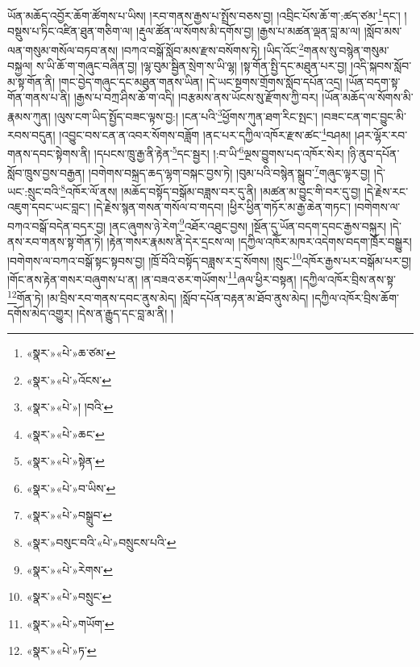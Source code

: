 ཡོན་མཆོད་འབྱོར་ཆོག་ཚོགས་པ་ཡིས། །རབ་གནས་རྒྱས་པ་སྤྲོས་བཅས་བྱ། །འབྲིང་པོས་ཆོ་ག་:ཚད་ཙམ་\footnote{«སྣར་»«པེ་»ཆ་ཙམ་}དང་། །བསྡུས་པ་ཏིང་འཛིན་ཐུན་གཅིག་ལ། །རྡུལ་ཚོན་ལ་སོགས་མི་དགོས་བྱ། །རྒྱས་པ་མཚན་ལྡན་བླ་མ་ལ། །སློབ་མས་ལན་གསུམ་གསོལ་བཏབ་ནས། །བཀའ་བསྒོ་སློབ་མས་རྫས་བསོགས་ཏེ། །ཡིད་འོང་\footnote{«སྣར་»«པེ་»འོངས་}གནས་སུ་བསྙེན་གསུམ་བསྐྱལ། ས་ཡི་ཆོ་ག་གཞུང་བཞིན་བྱ། །ལྷ་བུམ་སྦྱིན་སྲེག་ས་ཡི་ལྷ། །སྟ་གོན་སྤྱི་དང་མཐུན་པར་བྱ། །འདི་སྐབས་སློབ་མ་སྟ་གོན་ནི། །གང་བྱེད་གཞུང་དང་མཐུན་གནས་ཡིན། །དེ་ཡང་སྔགས་གྲོགས་སློབ་དཔོན་འདྲ། །ཡོན་བདག་སྟ་གོན་གནས་པ་ནི། །རྒྱས་པ་བཀྲ་ཤིས་ཆོ་ག་འདི། །བརྩམས་ནས་ཡོངས་སུ་རྫོགས་ཀྱི་བར། །ཡོན་མཆོད་ལ་སོགས་མི་རྣམས་ཀུན། །ལུས་ངག་ཡིད་སྤྱོད་བཟང་ལྟས་བྱ:། །ངན་པའི་\footnote{«སྣར་»«པེ་»། །བའི་}ཕྱོགས་ཀུན་ཐག་རིང་སྤང་། །བཟང་ངན་གང་བྱུང་མི་རབས་བདུན། །འབྱུང་བས་ངན་ན་འབར་སོགས་བཟློག །ནང་པར་དཀྱིལ་འཁོར་རྫས་ཚང་\footnote{«སྣར་»«པེ་»ཆང་}བཤམ། །ཤར་ལྷོར་རབ་གནས་དབང་སྟེགས་ནི། །དཔངས་ཁྲུ་རྒྱ་ནི་རྟེན་\footnote{«སྣར་»«པེ་»སྟེན་}དང་སྦྱར། །:བ་ཡི་\footnote{«སྣར་»«པེ་»བ་ཡིས་}ལྔས་བྱུགས་པད་འཁོར་སེར། །ཉི་ནུབ་དཔོན་སློབ་ཁྲུས་བྱས་བརྒྱན། །བགེགས་བསྐྲད་ཆད་ལྷག་བསྐང་བྱས་ཏེ། །བུམ་པའི་བསྙེན་སྒྲུབ་\footnote{«སྣར་»«པེ་»བསྒྲུབ་}གཞུང་ལྟར་བྱ། །དེ་ཡང་:སྲུང་བའི་\footnote{«སྣར་»བསུང་བའི་«པེ་»བསྲུངས་པའི་}འཁོར་ལོ་ནས། །མཆོད་བསྟོད་བསྒོམ་བཟླས་བར་དུ་ནི། །མཚན་མ་བྱུང་གི་བར་དུ་བྱ། །དེ་རྗེས་རང་འཇུག་དབང་ཡང་བླང་། །དེ་རྗེས་སྙན་གསན་གསོལ་བ་གདབ། །ཕྱིར་ཕྱིན་གཏོར་མ་རྒྱ་ཆེན་གཏང་། །བགེགས་ལ་བཀའ་བསྒོ་བདེན་བདར་བྱ། །ནང་ཞུགས་ཉེ་རེག་\footnote{«སྣར་»«པེ་»རེགས་}འཐོར་འཐུང་བྱས། །སྔོན་དུ་ཡོན་བདག་དབང་རྒྱས་བསྐུར། །དེ་ནས་རབ་གནས་སྟ་གོན་ཏེ། །རྟེན་གསར་རྣམས་ནི་དེར་དྲངས་ལ། །དཀྱིལ་འཁོར་མཁར་འདེགས་བདག་ཁྲོར་བསྒྱུར། །བགེགས་ལ་བཀའ་བསྒོ་སྟང་སྟབས་བྱ། །ཁྲོ་བོའི་བསྟོད་བཟླས་ར་དྲ་སོགས། །སྲུང་\footnote{«སྣར་»«པེ་»བསྲུང་}འཁོར་རྒྱས་པར་བསྒོམ་པར་བྱ། །གོང་ནས་རྟེན་གསར་བཞུགས་པ་ན། །ན་བཟའ་ཅར་གཡོགས་\footnote{«སྣར་»«པེ་»གཡོག་}ཞལ་ཕྱིར་བསྟན། །དཀྱིལ་འཁོར་བྲིས་ནས་སྟ་\footnote{«སྣར་»«པེ་»ཏ་}གོན་ཏེ། །མ་བྲིས་རབ་གནས་དབང་ནུས་མེད། །སློབ་དཔོན་བརྟན་མ་ཐོབ་ནུས་མེད། །དཀྱིལ་འཁོར་བྲིས་ཆོག་དགོས་མེད་འགྱུར། །དེས་ན་རྒྱུད་དང་བླ་མ་ནི། །
